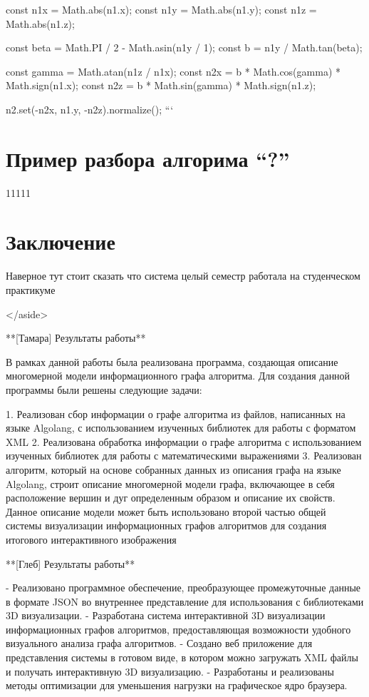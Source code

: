 const n1x = Math.abs(n1.x);
const n1y = Math.abs(n1.y);
const n1z = Math.abs(n1.z);

const beta = Math.PI / 2 - Math.asin(n1y / 1);
const b = n1y / Math.tan(beta);

const gamma = Math.atan(n1z / n1x);
const n2x = b * Math.cos(gamma) * Math.sign(n1.x);
const n2z = b * Math.sin(gamma) * Math.sign(n1.z);

n2.set(-n2x, n1.y, -n2z).normalize();
```

\section{Пример разбора алгорима “?”}

11111

\section{Заключение}


Наверное тут стоит сказать что система целый семестр работала на студенческом практикуме

</aside>

**[Тамара] Результаты работы**

В рамках данной работы была реализована программа, создающая описание многомерной модели информационного графа алгоритма. Для создания данной программы были решены следующие задачи:

1. Реализован сбор информации о графе алгоритма из файлов, написанных на языке Algolang, с использованием изученных библиотек для работы с форматом XML
2. Реализована обработка информации о графе алгоритма с использованием изученных библиотек для работы с математическими выражениями
3. Реализован алгоритм, который на основе собранных данных из описания графа на языке Algolang, строит описание многомерной модели графа, включающее в себя расположение вершин и дуг определенным образом и описание их свойств. Данное описание модели может быть использовано второй частью общей системы визуализации информационных графов алгоритмов для создания итогового интерактивного изображения

**[Глеб] Результаты работы**

- Реализовано программное обеспечение, преобразующее промежуточные данные в формате JSON во внутреннее представление для использования с библиотеками 3D визуализации.
- Разработана система интерактивной 3D визуализации информационных графов алгоритмов, предоставляющая возможности удобного визуального анализа графа алгоритмов.
- Создано веб приложение для представления системы в готовом виде, в котором можно загружать XML файлы и получать интерактивную 3D визуализацию.
- Разработаны и реализованы методы оптимизации для уменьшения нагрузки на графическое ядро браузера.


